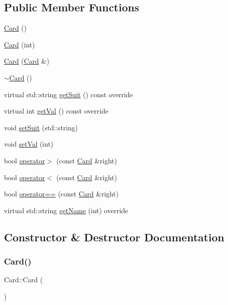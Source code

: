 \subsection*{Public Member Functions}
\begin{DoxyCompactItemize}
\item 
\mbox{\hyperlink{class_card_a783f5854cbe8c183ee3d4414c01472c0}{Card}} ()
\item 
\mbox{\hyperlink{class_card_a85f2e4a438c7fdfcff3bc2c6c2f64e42}{Card}} (int)
\item 
\mbox{\hyperlink{class_card_acd5e2392580684236188040fa874dbf2}{Card}} (\mbox{\hyperlink{class_card}{Card}} \&)
\item 
\mbox{\hyperlink{class_card_a4e05b0b68e43e5e76c6194458cee874f}{$\sim$\+Card}} ()
\item 
virtual std\+::string \mbox{\hyperlink{class_card_aab1167b9d62b97601624f5c3bef55e8f}{get\+Suit}} () const override
\item 
virtual int \mbox{\hyperlink{class_card_ae413a3c5a9bcd7bb320a1e7dc6c10f08}{get\+Val}} () const override
\item 
void \mbox{\hyperlink{class_card_a9a6a690f4520a415de2043d8a59eae77}{set\+Suit}} (std\+::string)
\item 
void \mbox{\hyperlink{class_card_a803b8640efc785d0b704740bbefd7407}{set\+Val}} (int)
\item 
bool \mbox{\hyperlink{class_card_aa3f8343a4851dadfccffabb328da5213}{operator$>$}} (const \mbox{\hyperlink{class_card}{Card}} \&right)
\item 
bool \mbox{\hyperlink{class_card_aa82800b9e7be48b843e93e113f2472ef}{operator$<$}} (const \mbox{\hyperlink{class_card}{Card}} \&right)
\item 
bool \mbox{\hyperlink{class_card_ac1b1dcac4434f8cc98719bad7c1d18a3}{operator==}} (const \mbox{\hyperlink{class_card}{Card}} \&right)
\item 
virtual std\+::string \mbox{\hyperlink{class_card_a829622deae536453d23467ae15f42259}{get\+Name}} (int) override
\end{DoxyCompactItemize}


\subsection{Constructor \& Destructor Documentation}
\mbox{\label{class_card_a783f5854cbe8c183ee3d4414c01472c0}} 
\subsubsection{\texorpdfstring{Card()}{Card()}\hspace{0.1cm}{\footnotesize\ttfamily [1/3]}}
{\footnotesize\ttfamily Card\+::\+Card (\begin{DoxyParamCaption}{ }\end{DoxyParamCaption})}

